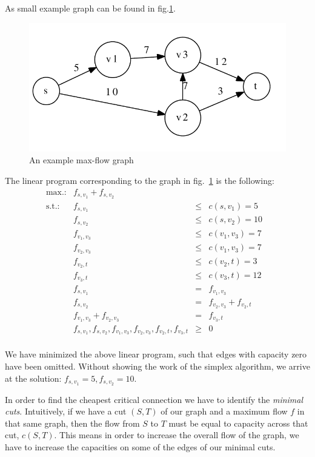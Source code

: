 \documentclass{article}
\begin{document}
As small example graph can be found in fig.\ref{fig:exg}.

\begin{figure}
  \centering
  \includegraphics[width=.7\textwidth]{exg.pdf}
  \caption{An example max-flow graph}
  \label{fig:exg}
\end{figure}

The linear program corresponding to the graph in fig.~\ref{fig:exg} is
the following:
\[
\begin{array}{lrcll}
\textrm{max.:} & f_{s,v_1} + f_{s,v_2} & & &\\
\textrm{s.t.:} & f_{s,v_1} &\leq & c(s,v_1) = 5&\\
               & f_{s,v_2} &\leq & c(s,v_2) = 10&\\
               & f_{v_1,v_3} &\leq & c(v_1,v_3) = 7&\\
               & f_{v_2,v_3} &\leq & c(v_1,v_3) = 7&\\
               & f_{v_2,t} &\leq & c(v_2,t) = 3&\\
               & f_{v_3,t} &\leq & c(v_3,t) = 12&\\
               & f_{s,v_1} &= &f_{v_1,v_3}&\\
               & f_{s,v_2} &= &f_{v_2,v_3} + f_{v_2,t}&\\
               & f_{v_1,v_3} + f_{v_2,v_3} &= &f_{v_3,t}&\\
& f_{s,v_1}, f_{s,v_2},f_{v_1,v_3},f_{v_2,v_3},f_{v_2,t}, f_{v_3,t} & \geq & 0\\
\end{array}
\]

We have minimized the above linear program, such that edges with
capacity zero have been omitted. Without showing the work of the
simplex algorithm, we arrive at the solution: $f_{s,v_1} = 5, f_{s,v_2} =
10$.

In order to find the cheapest critical connection we have to identify
the \emph{minimal cuts}. Intuitively, if we have a cut $(S, T)$ of our
graph and a maximum flow $f$ in that same graph, then the flow from
$S$ to $T$ must be equal to capacity across that cut, $c(S,T)$. This
means in order to increase the overall flow of the graph, we have to
increase the capacities on some of the edges of our minimal cuts.
\end{document}
